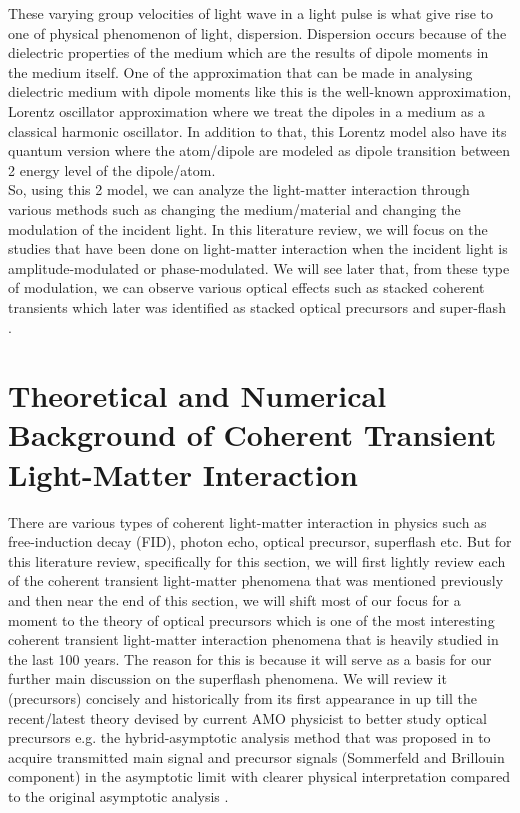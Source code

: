 These varying group velocities of light wave in a light pulse is what give rise to one of physical phenomenon of light, dispersion. Dispersion occurs because of the dielectric properties of the medium which are the results of dipole moments in the medium itself. One of the approximation that can be made in analysing dielectric medium with dipole moments like this is the well-known approximation, Lorentz oscillator approximation where we treat the dipoles in a medium as a classical harmonic oscillator. In addition to that, this Lorentz model also have its quantum version where the atom/dipole are modeled as dipole transition between 2 energy level of the dipole/atom.\\

So, using this 2 model, we can analyze the light-matter interaction through various methods such as changing the medium/material and changing the modulation of the incident light. In this literature review, we will focus on the studies that have been done on light-matter interaction when the incident light is amplitude-modulated or phase-modulated. We will see later that, from these type of modulation, we can observe various optical effects such as stacked coherent transients \cite{Segard_1987} which later was identified as stacked optical precursors \cite{jeong2010slow} and super-flash \cite{Kwong2014}.\\

\section{Theoretical and Numerical Background of Coherent Transient Light-Matter Interaction}
There are various types of coherent light-matter interaction in physics such as free-induction decay (FID), photon echo, optical precursor, superflash etc. But for this literature review, specifically for this section, we will first lightly review each of the coherent transient light-matter phenomena that was mentioned previously and then near the end of this section, we will shift most of our focus for a moment to the theory of optical precursors which is one of the most interesting coherent transient light-matter interaction phenomena that is heavily studied in the last 100 years. The reason for this is because it will serve as a basis for our further main discussion on the superflash phenomena. We will review it (precursors) concisely and historically from its first appearance in \cite{brillouin1969wave} up till the recent/latest theory devised by current AMO physicist to better study optical precursors e.g. the hybrid-asymptotic analysis method that was proposed in \cite{Jeong2009} to acquire transmitted main signal and precursor signals (Sommerfeld and Brillouin component) in the asymptotic limit with clearer physical interpretation compared to the original asymptotic analysis \cite{Sherman1981}.\\

